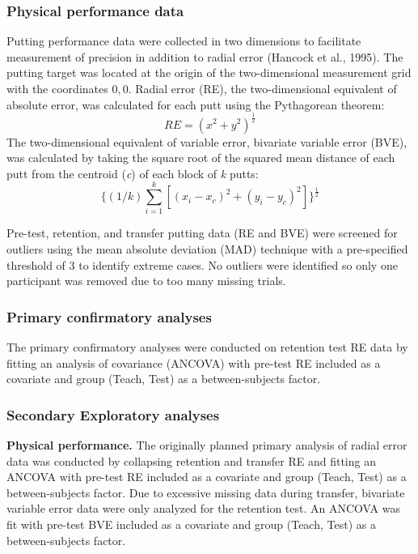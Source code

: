 \documentclass[
  english,
  man,floatsintext]{apa7}
\begin{document}
\hypertarget{physical-performance-data}{%
\subsubsection{Physical performance data}\label{physical-performance-data}}

Putting performance data were collected in two dimensions to facilitate measurement of precision in addition to radial error (Hancock et al., 1995). The putting target was located at the origin of the two-dimensional measurement grid with the coordinates \(0,0\). Radial error (RE), the two-dimensional equivalent of absolute error, was calculated for each putt using the Pythagorean theorem:
\[RE = (x^{2} + y^{2})^{\frac{1}{2}}\]
The two-dimensional equivalent of variable error, bivariate variable error (BVE), was calculated by taking the square root of the squared mean distance of each putt from the centroid (\emph{c}) of each block of \emph{k} putts:
\[\{(1/k)\sum_{i=1}^{k}[(x_{i} - x_{c})^{2} + (y_{i} - y_{c})^{2}]\}^{\frac{1}{2}}\]

Pre-test, retention, and transfer putting data (RE and BVE) were screened for outliers using the mean absolute deviation (MAD) technique with a pre-specified threshold of 3 to identify extreme cases. No outliers were identified so only one participant was removed due to too many missing trials.

\hypertarget{primary-confirmatory-analyses}{%
\subsubsection{Primary confirmatory analyses}\label{primary-confirmatory-analyses}}

The primary confirmatory analyses were conducted on retention test RE data by fitting an analysis of covariance (ANCOVA) with pre-test RE included as a covariate and group (Teach, Test) as a between-subjects factor.

\hypertarget{secondary-exploratory-analyses}{%
\subsubsection{Secondary Exploratory analyses}\label{secondary-exploratory-analyses}}

\textbf{Physical performance.} The originally planned primary analysis of radial error data was conducted by collapsing retention and transfer RE and fitting an ANCOVA with pre-test RE included as a covariate and group (Teach, Test) as a between-subjects factor. Due to excessive missing data during transfer, bivariate variable error data were only analyzed for the retention test. An ANCOVA was fit with pre-test BVE included as a covariate and group (Teach, Test) as a between-subjects factor.
\end{document}

